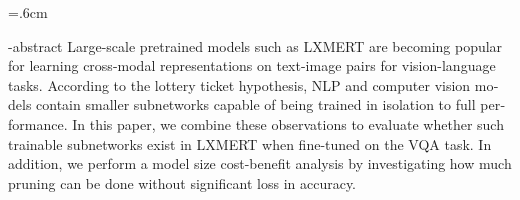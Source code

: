 
\baselineskip=.6cm
\begin{latin}

\en-abstract{
Large-scale pretrained models such as LXMERT are becoming popular for learning cross-modal representations on text-image pairs for vision-language tasks. According to the lottery ticket hypothesis, NLP and computer vision models contain smaller subnetworks capable of being trained in isolation to full performance. In this paper, we combine these observations to evaluate whether such trainable subnetworks exist in LXMERT when fine-tuned on the VQA task. In addition, we perform a model size cost-benefit analysis by investigating how much pruning can be done without significant loss in accuracy.
}
\latinfirstPage
\end{latin}
